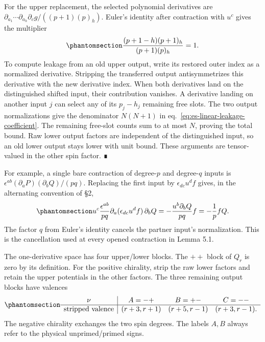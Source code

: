 \documentclass[
  english,
  11pt,
  reqno]{amsart}
\begin{document}
For the upper replacement, the selected polynomial derivatives are
\(\partial_{a_1}\cdots\partial_{a_h}\partial_cg/((p+1)(p)_h)\). Euler's
identity after contraction with \(u^c\) gives the multiplier
\begin{equation}\protect\phantomsection\label{eq:es-unit-linear-shift}{
 \frac{(p+1-h)(p+1)_h}{(p+1)(p)_h}=1.
}\end{equation} To compute leakage from an old upper output, write its
restored outer index as a normalized derivative. Stripping the
transferred output antisymmetrizes this derivative with the new
derivative index. When both derivatives land on the distinguished
shifted input, their contribution vanishes. A derivative landing on
another input \(j\) can select any of its \(p_j-h_j\) remaining free
slots. The two output normalizations give the denominator \(N(N+1)\) in
eq.~\ref{eq:es-linear-leakage-coefficient}. The remaining free-slot
counts sum to at most \(N\), proving the total bound. Raw lower output
factors are independent of the distinguished input, so an old lower
output stays lower with unit bound. These arguments are tensor-valued in
the other spin factor. ∎

For example, a single bare contraction of degree-\(p\) and degree-\(q\)
inputs is \(\epsilon^{ab}(\partial_aP)(\partial_bQ)/(pq)\). Replacing
the first input by \(\epsilon_{dc}u^df\) gives, in the alternating
convention of §2,
\begin{equation}\protect\phantomsection\label{eq:es-single-opened-edge-example}{
 u^c\frac{\epsilon^{ab}}{pq}
       \partial_a(\epsilon_{dc}u^df)\,\partial_bQ
 =-\frac{u^b\partial_bQ}{pq}f
 =-\frac1p fQ.
}\end{equation} The factor \(q\) from Euler's identity cancels the
partner input's normalization. This is the cancellation used at every
opened contraction in Lemma 5.1.

The one-derivative space has four upper/lower blocks. The \(++\) block
of \(Q_r\) is zero by its definition. For the positive chirality, strip
the raw lower factors and retain the upper potentials in the other
factors. The three remaining output blocks have valences
\begin{equation}\protect\phantomsection\label{eq:es-stripped-valences}{
 \begin{array}{c|ccc}
 \nu&A=-+&B=+-&C=--\\ \hline
 \text{stripped valence}&(r+3,r+1)&(r+5,r-1)&(r+3,r-1).
 \end{array}
}\end{equation} The negative chirality exchanges the two spin degrees.
The labels \(A,B\) always refer to the physical unprimed/primed signs.
\end{document}
